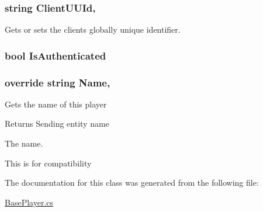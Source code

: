 \hypertarget{classOTA_1_1BasePlayer_a816fb41b89b7df273d909df9e9a1c701}{}
\subsubsection[{Client\+U\+U\+Id}]{\setlength{\rightskip}{0pt plus 5cm}string Client\+U\+U\+Id\hspace{0.3cm}{\ttfamily [get]}, {\ttfamily [set]}}\label{classOTA_1_1BasePlayer_a816fb41b89b7df273d909df9e9a1c701}


Gets or sets the clients globally unique identifier. 

\hypertarget{classOTA_1_1BasePlayer_a113748123407c45ee6c5faed4bd20edd}{}
\subsubsection[{Is\+Authenticated}]{\setlength{\rightskip}{0pt plus 5cm}bool Is\+Authenticated\hspace{0.3cm}{\ttfamily [get]}}\label{classOTA_1_1BasePlayer_a113748123407c45ee6c5faed4bd20edd}
\hypertarget{classOTA_1_1BasePlayer_ab0ac1d6f4f094b0171294b8bd22c06ac}{}
\subsubsection[{Name}]{\setlength{\rightskip}{0pt plus 5cm}override string Name\hspace{0.3cm}{\ttfamily [get]}, {}}\label{classOTA_1_1BasePlayer_ab0ac1d6f4f094b0171294b8bd22c06ac}


Gets the name of this player 

\begin{DoxyReturn}{Returns}
Sending entity name
\end{DoxyReturn}


The name.

This is for compatibility

The documentation for this class was generated from the following file\+:\begin{DoxyCompactItemize}
\item 
\hyperlink{BasePlayer_8cs}{Base\+Player.\+cs}\end{DoxyCompactItemize}
